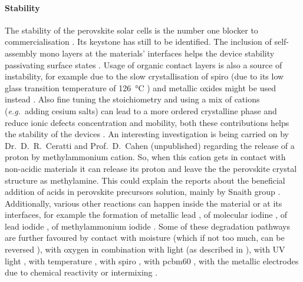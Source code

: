 	\paragraph{Stability}\label{intro_stability}
	The stability of the perovskite solar cells is the number one blocker to commercialisation \cite{Reyna2018}.
	Its keystone has still to be identified.
	The inclusion of self\hyp{}assembly mono layers at the materials' interfaces helps the device stability passivating surface states \cite{Lira-Cantu2017,Mingorance2018}.
	Usage of organic contact layers is also a source of instability, for example due to the slow crystallisation of \gls{spiro} \cite{Malinauskas2015} (due to its low glass transition temperature of \SI{126}{\celsius} \cite{Malinauskas2016}) and metallic oxides might be used instead \cite{Mingorance2018}.
	Also fine tuning the stoichiometry and using a mix of cations (\textsl{e.g.}\ adding cesium salts) can lead to a more ordered crystalline phase and reduce ionic defects concentration and mobility, both these contributions helps the stability of the devices \cite{Reyna2018}.
	An interesting investigation is being carried on by Dr.\ D.\ R.\ Ceratti and Prof.\ D.\ Cahen (unpublished) regarding the release of a proton by methylammonium cation.
	So, when this cation gets in contact with non-acidic materials it can release its proton and leave the the perovskite crystal structure as methylamine.
	This could explain the reports about the beneficial addition of acids in perovskite precursors solution, mainly by Snaith group \cite{Noel2017,Zhang2015a,Nayak2016}.
	Additionally, various other reactions can happen inside the material or at its interfaces, for example the formation of metallic lead \cite{Birkhold2018a,Sadoughi2015}, of molecular iodine \cite{Minns2017}, of lead iodide \cite{Buin2015,Walsh2015}, of methylammonium iodide \cite{Walsh2015}.
Some of these degradation pathways are further favoured by contact with moisture \cite{Jong2018,Schlipf2019,Hu2017,Han2015a} (which if not too much, can be reversed \cite{Leguy2015}), with oxygen in combination with light \cite{Senocrate2018a,Aristidou2017} (as described in ), with UV light \cite{Lee2016}, with temperature \cite{Philippe2015,Conings2015}, with \gls{spiro} \cite{Carrillo2016,Kim2017,Kim2016a}, with \gls{pcbm60} \cite{DeBastiani2016}, with the metallic electrodes due to chemical reactivity \cite{Kato2015,Guerrero2016a,Back2016,Zhao2016,DeBastiani2016} or intermixing \cite{Domanski2016}.



